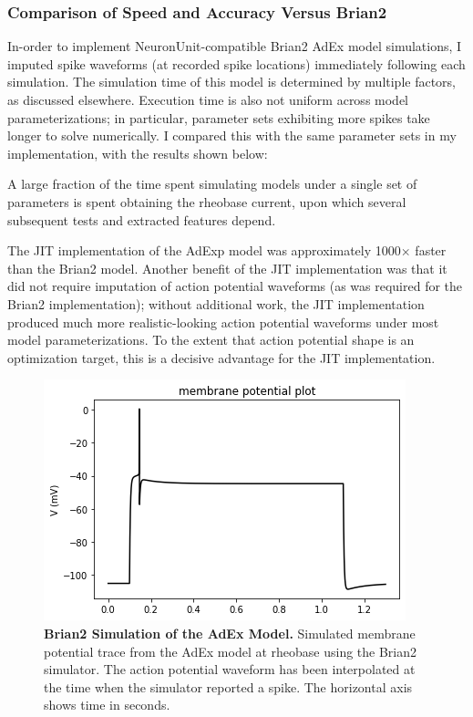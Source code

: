 \subsubsection{Comparison of Speed and Accuracy Versus Brian2}
In-order to implement NeuronUnit-compatible Brian2 AdEx model simulations, I imputed spike waveforms (at recorded spike locations) immediately following each simulation.
The simulation time of this model is determined by multiple factors, as discussed elsewhere. Execution time is also not uniform across model parameterizations; in particular, parameter sets exhibiting more spikes take longer to solve numerically.
I compared this with the same parameter sets in my implementation, with the results shown below:

A large fraction of the time spent simulating models under a single set of parameters is spent obtaining the rheobase current, upon which several subsequent tests and extracted features depend.

The JIT implementation of the AdExp model was approximately 1000$\times$ faster than the Brian2 model.
Another benefit of the JIT implementation was that it did not require imputation of action potential waveforms (as was required for the Brian2 implementation); without additional work, the JIT implementation produced much more realistic-looking action potential waveforms under most model parameterizations.
To the extent that action potential shape is an optimization target, this is a decisive advantage for the JIT implementation.

\begin{figure}[!htb]
\begin{center}
\includegraphics[scale=0.7]{figures/backend_check_files/backend_check_12_10.png}
\caption[Brian2 simulation of the AdEx Model]{\textbf{Brian2 Simulation of the AdEx Model.} Simulated membrane potential trace from the AdEx model at rheobase using the Brian2 simulator. The action potential waveform has been interpolated at the time when the simulator reported a spike.
The horizontal axis shows time in seconds.}
\label{fig:AdEx-Brian2-sim}
\end{center}
\end{figure}


